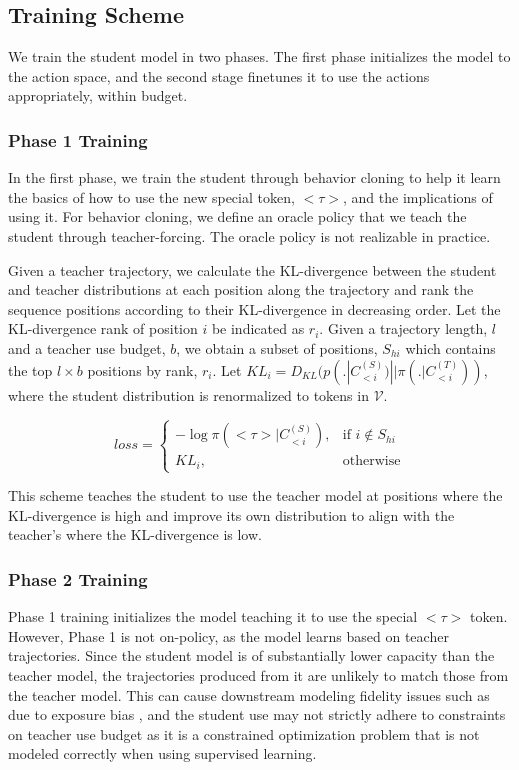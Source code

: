 \subsection{Training Scheme}

We train the student model in two phases. The first phase initializes the model to the action space, and the second stage finetunes it to use the actions appropriately, within budget.

\subsubsection{Phase 1 Training}

In the first phase, we train the student through behavior cloning to help it learn the basics of how to use the new special token, $<\tau>$, and the implications of using it.  For behavior cloning, we define an oracle policy that we teach the student through teacher-forcing. The oracle policy is not realizable in practice.

Given a teacher trajectory, we calculate the KL-divergence between the student and teacher distributions at each position along the trajectory and rank the sequence positions according to their KL-divergence in decreasing order. Let the KL-divergence rank of position $i$ be indicated as $r_i$.  Given a trajectory length, $l$ and a teacher use budget, $b$, we obtain a subset of positions, $S_{hi}$ which contains the top $l \times b$ positions by rank, $r_i$. Let $KL_i = D_{KL}(p(.|C^{(S)}_{<i})||\pi(.|C^{(T)}_{<i}))$, where the student distribution is renormalized to tokens in $\mathcal{V}$.

\begin{equation}
    loss = \begin{cases}
        -\log \pi(<\tau>|C^{(S)}_{<i}), &\text{if } i \notin S_{hi} \\
        KL_i,&\text{otherwise}
    \end{cases}
\end{equation}

This scheme teaches the student to use the teacher model at positions where the KL-divergence is high and improve its own distribution to align with the teacher's where the KL-divergence is low.

\subsubsection{Phase 2 Training}

Phase 1 training initializes the model teaching it to use the special $<\tau>$ token.  However, Phase 1 is not on-policy, as the model learns based on teacher trajectories. Since the student model is of substantially lower capacity than the teacher model, the trajectories produced from it are unlikely to match those from the teacher model. This can cause downstream modeling fidelity issues such as due to exposure bias \cite{ranzato2015sequence}, and the student use may not strictly adhere to constraints on teacher use budget as it is a constrained optimization problem that is not modeled correctly when using supervised learning.

